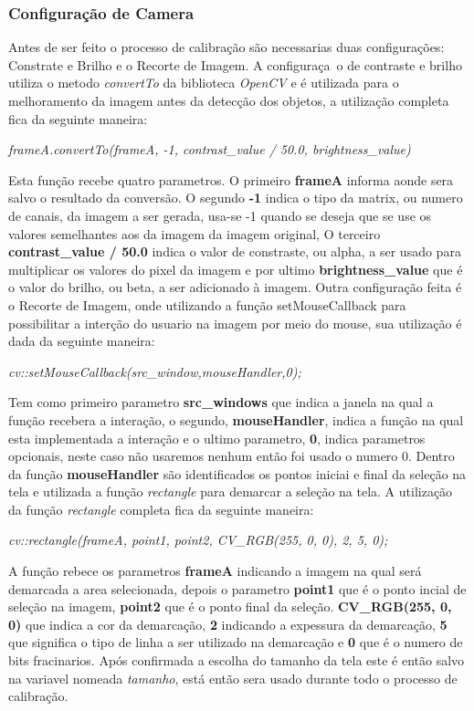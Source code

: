 	\subsubsection{Configuração de Camera}
Antes de ser feito o processo de calibração são necessarias duas configurações: Constrate e Brilho e o Recorte de Imagem.
A configuraça~o de contraste e brilho utiliza o metodo \textit{convertTo} da biblioteca \textit{OpenCV} e é utilizada para o melhoramento da imagem antes da detecção dos objetos, a utilização completa fica da seguinte maneira:
\begin{center}
\centering \textit{ frameA.convertTo(frameA, -1, contrast\_value / 50.0, brightness\_value)}
\end{center}
Esta função recebe quatro parametros. O primeiro \textbf{frameA} informa aonde sera salvo o resultado da conversão. O segundo \textbf{-1} indica o tipo da matrix, ou numero de canais, da imagem a ser gerada, usa-se -1 quando se deseja que se use os valores semelhantes aos da imagem da imagem original\cite{OpenCV}, O terceiro \textbf{contrast\_value / 50.0} indica o valor de constraste, ou alpha, a ser usado para multiplicar os valores do pixel da imagem\cite{OpenCV} e por ultimo \textbf{brightness\_value} que é o valor do brilho, ou beta, a ser adicionado à imagem. \newline
Outra configuração feita é o Recorte de Imagem, onde utilizando a função setMouseCallback para possibilitar a interção do usuario na imagem por meio do mouse, sua utilização é dada da seguinte maneira:
\begin{center}
\centering \textit{ cv::setMouseCallback(src\_window,mouseHandler,0);}
\end{center}
Tem como primeiro parametro \textbf{src\_windows} que indica a janela na qual a função recebera a interação,  o segundo, \textbf{mouseHandler}, indica a função na qual esta implementada a interação e o ultimo parametro, \textbf{0}, indica parametros opcionais, neste caso não usaremos nenhum então foi usado o numero 0.
Dentro da função \textbf{mouseHandler} são identificados os pontos iniciai e final da seleção na tela e utilizada a função \textit{rectangle} para demarcar a seleção na tela. A utilização da função \textit{rectangle} completa fica da seguinte maneira:
\begin{center}
\centering \textit{ cv::rectangle(frameA, point1, point2, CV\_RGB(255, 0, 0), 2, 5, 0);}
\end{center}
A função rebece os parametros \textbf{frameA} indicando a imagem na qual será demarcada a area selecionada, depois o parametro \textbf{point1} que é o ponto incial de seleção na imagem, \textbf{point2} que é o ponto final da seleção. \textbf{CV\_RGB(255, 0, 0)} que indica a cor da demarcação, \textbf{2} indicando a expessura da demarcação, \textbf{5} que significa o tipo de linha a ser utilizado na demarcação e \textbf{0} que é o numero de bits fracinarios.
 Após confirmada a escolha do tamanho da tela 
este é então salvo na variavel nomeada \textit{tamanho}, está então sera usado durante todo o processo de calibração.
\newpage
